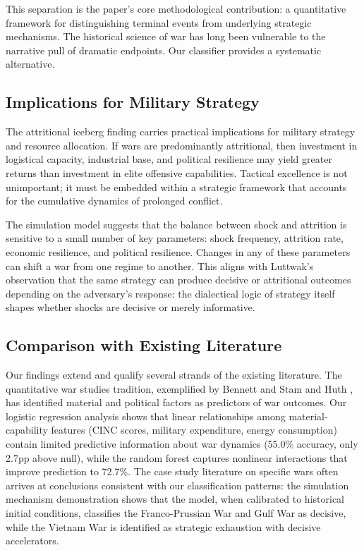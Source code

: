 This separation is the paper's core methodological contribution: a quantitative framework for distinguishing terminal events from underlying strategic mechanisms. The historical science of war has long been vulnerable to the narrative pull of dramatic endpoints. Our classifier provides a systematic alternative.

\subsection{Implications for Military Strategy}

The attritional iceberg finding carries practical implications for military strategy and resource allocation. If wars are predominantly attritional, then investment in logistical capacity, industrial base, and political resilience may yield greater returns than investment in elite offensive capabilities. Tactical excellence is not unimportant; it must be embedded within a strategic framework that accounts for the cumulative dynamics of prolonged conflict.

The simulation model suggests that the balance between shock and attrition is sensitive to a small number of key parameters: shock frequency, attrition rate, economic resilience, and political resilience. Changes in any of these parameters can shift a war from one regime to another. This aligns with Luttwak's observation \citep{luttwak1976} that the same strategy can produce decisive or attritional outcomes depending on the adversary's response: the dialectical logic of strategy itself shapes whether shocks are decisive or merely informative.

\subsection{Comparison with Existing Literature}

Our findings extend and qualify several strands of the existing literature. The quantitative war studies tradition, exemplified by Bennett and Stam \citep{bennett2000} and Huth \citep{huth1996}, has identified material and political factors as predictors of war outcomes. Our logistic regression analysis shows that linear relationships among material-capability features (CINC scores, military expenditure, energy consumption) contain limited predictive information about war dynamics (55.0\% accuracy, only 2.7pp above null), while the random forest captures nonlinear interactions that improve prediction to 72.7\%. The case study literature on specific wars often arrives at conclusions consistent with our classification patterns: the simulation mechanism demonstration shows that the model, when calibrated to historical initial conditions, classifies the Franco-Prussian War and Gulf War as decisive, while the Vietnam War is identified as strategic exhaustion with decisive accelerators.

